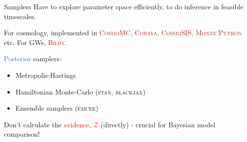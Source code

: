 \documentclass[aspectratio=169, 11pt]{beamer}
\begin{document}

    


\begin{frame}{Samplers}\vfill
Have to explore parameter space efficiently, to do inference in feasible timescales. 
\vfill  

For cosmology, implemented in \textcolor{firebrick}{\textsc{CosmoMC, Cobaya, CosmoSIS, Monte Python}} etc. For GWs, \textcolor{firebrick}{\textsc{Bilby}}.
    \vfill

    \textcolor{RoyalBlue}{Posterior} samplers:
    \begin{itemize}
        \item Metropolis-Hastings 
        \item Hamiltonian Monte-Carlo (\textsc{stan, blackjax})
        \item Ensemble samplers (\textsc{emcee})
    \end{itemize}
    \vfill

    Don't calculate the \textcolor{red}{evidence}, \textcolor{red}{$\mathcal{Z}$} (directly) - crucial for Bayesian model comparison!

    
\end{frame}



\end{document}
